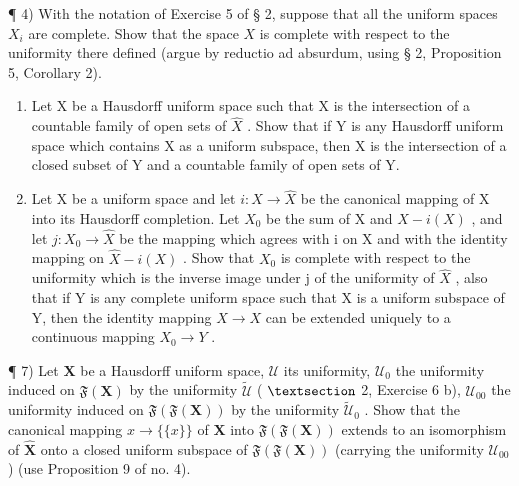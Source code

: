 ¶ 4) With the notation of Exercise 5 of § 2, suppose that all the uniform spaces \(X_i\) are complete. Show that the space \(X\) is complete with respect to the uniformity there defined (argue by reductio ad absurdum, using § 2, Proposition 5, Corollary 2).

\begin{enumerate}
\def\labelenumi{\arabic{enumi})}
\setcounter{enumi}{4}
\item
  Let X be a Hausdorff uniform space such that X is the intersection of a countable family of open sets of \(\hat{X}\) . Show that if Y is any Hausdorff uniform space which contains X as a uniform subspace, then X is the intersection of a closed subset of Y and a countable family of open sets of Y.
\item
  Let X be a uniform space and let \(i: X \to \hat{X}\) be the canonical mapping of X into its Hausdorff completion. Let \(X_{0}\) be the sum of X and \(\hat{X} - i(X)\) , and let \(j: X_{0} \to \hat{X}\) be the mapping which agrees with i on X and with the identity mapping on \(\hat{X} - i(X)\) . Show that \(X_{0}\) is complete with respect to the uniformity which is the inverse image under j of the uniformity of \(\hat{X}\) , also that if Y is any complete uniform space such that X is a uniform subspace of Y, then the identity mapping \(X \to X\) can be extended uniquely to a continuous mapping \(X_{0} \to Y\) .
\end{enumerate}

¶ 7) Let \(\mathbf{X}\) be a Hausdorff uniform space, \(\mathcal{U}\) its uniformity, \(\mathcal{U}_0\) the uniformity induced on \(\mathfrak{F}(\mathbf{X})\) by the uniformity \(\tilde{\mathcal{U}}\) ( \(\S\) 2, Exercise 6 b), \(\mathcal{U}_{00}\) the uniformity induced on \(\mathfrak{F}(\mathfrak{F}(\mathbf{X}))\) by the uniformity \(\tilde{\mathcal{U}}_0\) . Show that the canonical mapping \(x \to \{\{x\}\}\) of \(\mathbf{X}\) into \(\mathfrak{F}(\mathfrak{F}(\mathbf{X}))\) extends to an isomorphism of \(\hat{\mathbf{X}}\) onto a closed uniform subspace of \(\mathfrak{F}(\mathfrak{F}(\mathbf{X}))\) (carrying the uniformity \(\mathcal{U}_{00}\) ) (use Proposition 9 of no. 4).

